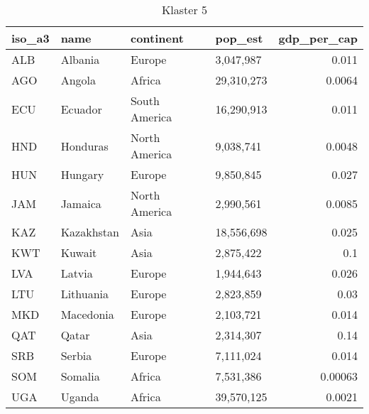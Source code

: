 \begin{table}
    \centering
    \caption{Klaster 5}
    \label{tab:cl5}
    \begin{tabular}{llllr}
        \toprule
        iso\_a3 & name       & continent     & pop\_est   & gdp\_per\_cap \\
        \midrule
        ALB     & Albania    & Europe        & 3,047,987  & 0.011         \\
        AGO     & Angola     & Africa        & 29,310,273 & 0.0064        \\
        ECU     & Ecuador    & South America & 16,290,913 & 0.011         \\
        HND     & Honduras   & North America & 9,038,741  & 0.0048        \\
        HUN     & Hungary    & Europe        & 9,850,845  & 0.027         \\
        JAM     & Jamaica    & North America & 2,990,561  & 0.0085        \\
        KAZ     & Kazakhstan & Asia          & 18,556,698 & 0.025         \\
        KWT     & Kuwait     & Asia          & 2,875,422  & 0.1           \\
        LVA     & Latvia     & Europe        & 1,944,643  & 0.026         \\
        LTU     & Lithuania  & Europe        & 2,823,859  & 0.03          \\
        MKD     & Macedonia  & Europe        & 2,103,721  & 0.014         \\
        QAT     & Qatar      & Asia          & 2,314,307  & 0.14          \\
        SRB     & Serbia     & Europe        & 7,111,024  & 0.014         \\
        SOM     & Somalia    & Africa        & 7,531,386  & 0.00063       \\
        UGA     & Uganda     & Africa        & 39,570,125 & 0.0021        \\
        \bottomrule
    \end{tabular}
\end{table}

